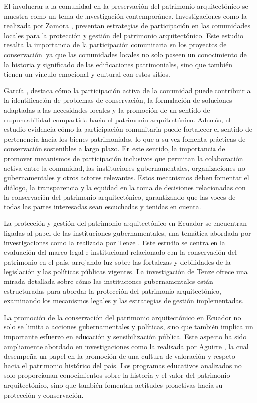 \documentclass[journal,article,submit,pdftex,moreauthors]{Definitions/mdpi}
\begin{document}
El involucrar a la comunidad en la preservación del patrimonio arquitectónico se muestra como un tema de investigación contemporánea. Investigaciones como la realizada por Zamora \cite{art:articulo16}, presentan estrategias de participación en las comunidades locales para la protección y gestión del patrimonio arquitectónico. Este estudio resalta la importancia de la participación comunitaria en los proyectos de conservación, ya que las comunidades locales no solo poseen un conocimiento de la historia y significado de las edificaciones patrimoniales, sino que también tienen un vínculo emocional y cultural con estos sitios. 

García \cite{art:articulo17}, destaca cómo la participación activa de la comunidad puede contribuir a la identificación de problemas de conservación, la formulación de soluciones adaptadas a las necesidades locales y la promoción de un sentido de responsabilidad compartida hacia el patrimonio arquitectónico. Además, el estudio evidencia cómo la participación comunitaria puede fortalecer el sentido de pertenencia hacia los bienes patrimoniales, lo que a su vez fomenta prácticas de conservación sostenibles a largo plazo. En este sentido, la importancia de promover mecanismos de participación inclusivos que permitan la colaboración activa entre la comunidad, las instituciones gubernamentales, organizaciones no gubernamentales y otros actores relevantes. Estos mecanismos deben fomentar el diálogo, la transparencia y la equidad en la toma de decisiones relacionadas con la conservación del patrimonio arquitectónico, garantizando que las voces de todas las partes interesadas sean escuchadas y tenidas en cuenta.

La protección y gestión del patrimonio arquitectónico en Ecuador se encuentran ligadas al papel de las instituciones gubernamentales, una temática abordada por investigaciones como la realizada por Tenze \cite{art:articulo18}. Este estudio se centra en la evaluación del marco legal e institucional relacionado con la conservación del patrimonio en el país, arrojando luz sobre las fortalezas y debilidades de la legislación y las políticas públicas vigentes. La investigación de Tenze ofrece una mirada detallada sobre cómo las instituciones gubernamentales están estructuradas para abordar la protección del patrimonio arquitectónico, examinando los mecanismos legales y las estrategias de gestión implementadas.  

La promoción de la conservación del patrimonio arquitectónico en Ecuador no solo se limita a acciones gubernamentales y políticas, sino que también implica un importante esfuerzo en educación y sensibilización pública. Este aspecto ha sido ampliamente abordado en investigaciones como la realizada por Aguirre \cite{art:articulo21}, la cual desempeña un papel en la promoción de una cultura de valoración y respeto hacia el patrimonio histórico del país. Los programas educativos analizados no solo proporcionan conocimientos sobre la historia y el valor del patrimonio arquitectónico, sino que también fomentan actitudes proactivas hacia su protección y conservación.
\end{document}
